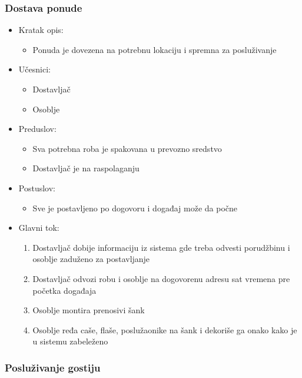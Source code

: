 \documentclass[a4paper]{article}
\begin{document}
\subsubsection{Dostava ponude}

\begin{itemize}
    \item Kratak opis:
        \begin{itemize}
            \item Ponuda je dovezena na potrebnu lokaciju i spremna za posluživanje
        \end{itemize}
    \item Učesnici:
        \begin{itemize}
            \item Dostavljač
            \item Osoblje
        \end{itemize}
    \item Preduslov:
        \begin{itemize}
            \item Sva potrebna roba je spakovana u prevozno sredstvo
		    \item Dostavljač je na raspolaganju	
        \end{itemize}
    \item Postuslov:
        \begin{itemize}
            \item Sve je postavljeno po dogovoru i događaj može da počne
        \end{itemize}
    \item Glavni tok:
        \begin{enumerate}
            \item Dostavljač dobije informaciju iz sistema gde treba odvesti porudžbinu i osoblje zaduženo za postavljanje
           \item Dostavljač odvozi robu i osoblje na dogovorenu adresu sat vremena pre početka događaja 
		    \item Osoblje montira prenosivi šank  
		    \item Osoblje ređa caše, flaše, poslužaonike na šank i dekoriše ga onako kako je u sistemu zabeleženo
		    
        \end{enumerate}
    
\end{itemize}

\subsubsection{Posluživanje gostiju}
\end{document}
